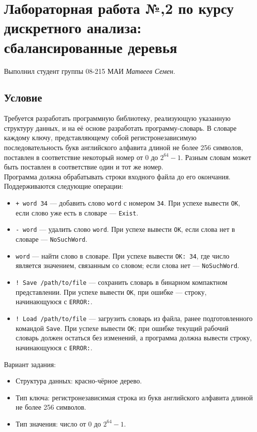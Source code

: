 \documentclass[12pt]{article}
\begin{document}
\section*{Лабораторная работа №,2 по курсу дискретного анализа: сбалансированные деревья}

Выполнил студент группы 08-215 МАИ \textit{Матвеев Семен}.

\subsection*{Условие}
\hspace{2ex}
Требуется разработать программную библиотеку, реализующую указанную структуру данных, и на её основе разработать программу-словарь. В словаре каждому ключу, представляющему собой регистронезависимую последовательность букв английского алфавита длиной не более 256 символов, поставлен в соответствие некоторый номер от $0$ до $2^{64} - 1$. Разным словам может быть поставлен в соответствие один и тот же номер. \\

Программа должна обрабатывать строки входного файла до его окончания. Поддерживаются следующие операции:
\begin{itemize}
    \item \texttt{+ word 34} — добавить слово \texttt{word} с номером \texttt{34}. При успехе вывести \texttt{OK}, если слово уже есть в словаре — \texttt{Exist}.
    \item \texttt{- word} — удалить слово \texttt{word}. При успехе вывести \texttt{OK}, если слова нет в словаре — \texttt{NoSuchWord}.
    \item \texttt{word} — найти слово в словаре. При успехе вывести \texttt{OK: 34}, где число является значением, связанным со словом; если слова нет — \texttt{NoSuchWord}.
    \item \texttt{! Save /path/to/file} — сохранить словарь в бинарном компактном представлении. При успехе вывести \texttt{OK}, при ошибке — строку, начинающуюся с \texttt{ERROR:}.
    \item \texttt{! Load /path/to/file} — загрузить словарь из файла, ранее подготовленного командой \texttt{Save}. При успехе вывести \texttt{OK}; при ошибке текущий рабочий словарь должен остаться без изменений, а программа должна вывести строку, начинающуюся с \texttt{ERROR:}.
\end{itemize}

Вариант задания:
\begin{itemize}
    \item Структура данных: красно-чёрное дерево.
    \item Тип ключа: регистронезависимая строка из букв английского алфавита длиной не более 256 символов.
    \item Тип значения: число от $0$ до $2^{64} - 1$.
\end{itemize}
\end{document}
